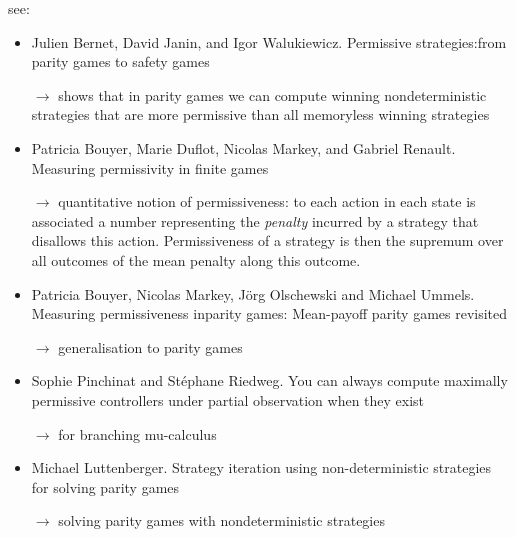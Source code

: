 
see:
\begin{itemize}
\item Julien Bernet, David Janin, and Igor Walukiewicz. Permissive
  strategies:from parity games to safety games

  $\rightarrow$ shows that in parity games we can compute winning nondeterministic
  strategies that are more permissive than all memoryless winning strategies
\item Patricia Bouyer, Marie Duflot, Nicolas Markey, and Gabriel
  Renault. Measuring permissivity in finite games

  $\rightarrow$ quantitative notion of permissiveness: to each action in
  each state is associated a number representing the \emph{penalty}
  incurred by a strategy that disallows this action. Permissiveness of
  a strategy is then the supremum over all outcomes of the mean
  penalty along this outcome.
  
\item Patricia Bouyer, Nicolas Markey, Jörg Olschewski and Michael
  Ummels. Measuring permissiveness inparity games: Mean-payoff parity
  games revisited

  $\rightarrow$ generalisation to parity games
  
\item Sophie Pinchinat and Stéphane Riedweg. You can always compute
  maximally permissive controllers under partial observation when they
  exist
  
$\rightarrow$   for branching mu-calculus

  
\item Michael Luttenberger. Strategy iteration using non-deterministic
  strategies for solving parity games  

$\rightarrow$ solving parity games with nondeterministic strategies

\end{itemize}

